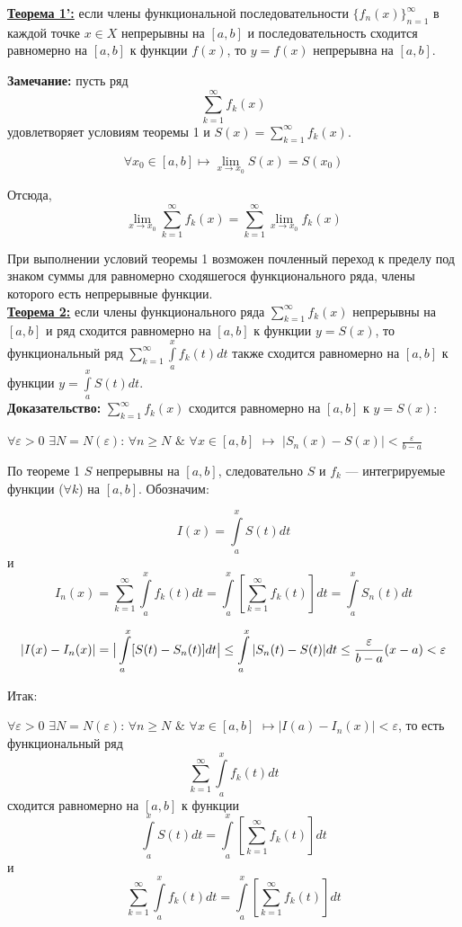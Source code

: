 \documentclass[a4paper,12pt]{article} %
\begin{document}
\underline{\textbf{Теорема 1':}} если члены функциональной последовательности $\{f_n(x)\}_{n=1}^\infty$ в каждой точке $x \in X$  непрерывны на $[a,b]$ и последовательность сходится равномерно на $[a,b]$ к функции $f(x)$, то $y = f(x)$ непрерывна на $[a,b]$. 

\textbf{Замечание:} пусть ряд $$\sum\limits_{k = 1}^{\infty}  f_k(x)$$ удовлетворяет условиям теоремы 1 и $S(x)=\sum\limits_{k = 1}^{\infty}  f_k(x)$.

$$\forall x_0 \in [a,b] \longmapsto \lim\limits_{x\rightarrow x_0} S(x) = S(x_0)$$

Отсюда, $$\lim\limits_{x\rightarrow x_0} \sum\limits_{k = 1}^{\infty}  f_k(x) = \sum\limits_{k = 1}^{\infty}  \lim\limits_{x\rightarrow x_0}f_k(x) $$

При выполнении условий теоремы 1 возможен почленный переход к пределу под знаком суммы для  равномерно сходяшегося функционального ряда, члены которого есть непрерывные функции.\\

\underline{\textbf{Теорема 2:}} если члены функционального ряда $\sum\limits_{k = 1}^{\infty}  f_k(x)$   непрерывны на $[a,b]$ и ряд сходится равномерно на $[a,b]$ к функции $y = S(x)$, то функциональный ряд $\sum\limits_{k = 1}^{\infty}  \int\limits_{a}^{x}f_k(t)dt$ также сходится равномерно на $[a,b]$ к функции $y = \int\limits_{a}^{x}S(t)dt $.\\

\textbf{Доказательство:}
$\sum\limits_{k = 1}^{\infty}  f_k(x)$  сходится равномерно на $[a,b]$ к $y = S(x)$:

$\forall \varepsilon > 0$  $\exists N = N(\varepsilon)$: $\forall n \geqslant N$ $\& $ $\forall x \in [a,b]$ $\longmapsto$ $|S_n(x)-S(x)| < \frac{\varepsilon}{b - a}$

По теореме 1 $S$ непрерывны на $[a,b]$, следовательно $S$ и $f_k $ --- интегрируемые функции ($\forall k$) на $[a,b]$. Обозначим:

$$I(x) = \int\limits_{a}^{x}S(t)dt$$ и $$I_{n}(x) = \sum\limits_{k = 1}^{\infty}  \int\limits_{a}^{x}f_k(t)dt = \int\limits_{a}^{x}[ \sum\limits_{k = 1}^{\infty}  f_k(t) ]dt = \int\limits_{a}^x S_n(t)dt$$

$$|I(x)-I_n(x)| = \big|\int\limits_{a}^x[S(t)-S_n(t)]dt\big| \leq \int\limits_{a}^x|S_n(t)-S(t)|dt \leq {\varepsilon \over {b-a}} (x-a) < \varepsilon$$

Итак: 

$\forall \varepsilon > 0 $ $\exists N=N(\varepsilon)$: $\forall n \geq N$  $\&$ $\forall x \in [a,b]$ $\longmapsto |I(a)-I_n(x)| < \varepsilon$, то есть функциональный ряд $$\sum\limits_{k = 1}^{\infty} \int\limits_{a}^{x}f_k(t)dt$$ сходится равномерно на $[a,b]$ к функции $$\int\limits_a^xS(t)dt = \int\limits_{a}^{x}[ \sum\limits_{k = 1}^{\infty}  f_k(t) ]dt$$ и $$\sum\limits_{k = 1}^{\infty}  \int\limits_{a}^{x}f_k(t)dt = \int\limits_{a}^{x}[ \sum\limits_{k = 1}^{\infty}  f_k(t) ]dt$$\\
\end{document}

